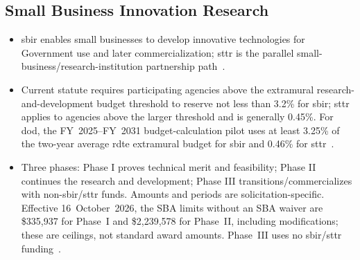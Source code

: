 \documentclass[../main.tex]{subfiles}
\begin{document}
\subsection{Small Business Innovation Research}
\begin{itemize}
  \item \ac{sbir} enables small businesses to develop innovative technologies for Government use and later commercialization; \ac{sttr} is the parallel small-business/research-institution partnership path~\autocite{edo-3-2-2-solicitation-prep-2025,USC-638-SBIR,SBIR-Apply-2026}.
  \item Current statute requires participating agencies above the extramural research-and-development budget threshold to reserve not less than 3.2\% for \ac{sbir}; \ac{sttr} applies to agencies above the larger threshold and is generally 0.45\%. For \ac{dod}, the FY~2025--FY~2031 budget-calculation pilot uses at least 3.25\% of the two-year average \ac{rdte} extramural budget for \ac{sbir} and 0.46\% for \ac{sttr}~\autocite{USC-638-SBIR}.
  \item Three phases: Phase I proves technical merit and feasibility; Phase II continues the research and development; Phase III transitions/commercializes with non-\ac{sbir}/\ac{sttr} funds. Amounts and periods are solicitation-specific. Effective 16~October~2026, the SBA limits without an SBA waiver are \$335,937 for Phase~I and \$2,239,578 for Phase~II, including modifications; these are ceilings, not standard award amounts. Phase~III uses no \ac{sbir}/\ac{sttr} funding~\autocite{edo-3-2-2-solicitation-prep-2025,SBA-SBIR-Limits-20261016}.
\end{itemize}
\end{document}
